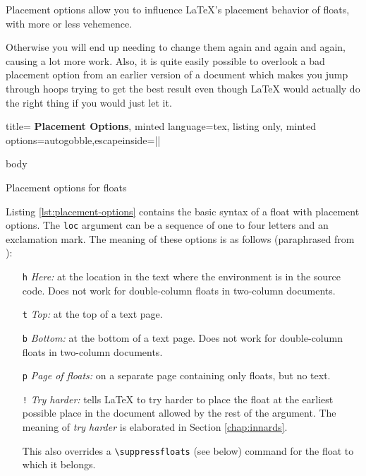 \documentclass[article,a4paper,oneside,10pt]{memoir}
\newcommand\code[1]{\texttt{#1}}
\begin{document}
Placement  options  allow you  to  influence  \LaTeX's placement  behavior  of
floats, with more or less vehemence.

 Otherwise you will end up needing to change them again and
again and again, causing a lot more work. Also, it is quite easily possible to
overlook  a  bad placement  option  from  an  earlier  version of  a  document
which  makes  you jump  through  hoops  trying to  get  the  best result  even
though  \LaTeX{} would  actually do  the  right thing  if you  would just  let
it\footnotemark.


\begin{listing}
    \begin{tcblisting}{%
            title={\bfseries\sffamily%
                Placement Options},
            minted language=tex,
            listing only,
            minted options={autogobble,escapeinside=||}}
            \begin{float type}[|\textcolor{solarized-red}{loc}|] body \end{float type}
    \end{tcblisting}
    \caption{Placement options for floats}
    \label{lst:placement-options}
\end{listing}

Listing \ref{lst:placement-options} contains the basic  syntax of a float with
placement options. The  \code{loc} argument can be  a sequence of one  to four
letters and  an exclamation mark. The meaning  of these options is  as follows
(paraphrased from \cite{lamport}):

\begin{itemize}
    \item  [\code{h}] \emph{Here:}  at  the  location in  the  text where  the
        environment is  in the  source code. Does  not work  for double-column
        floats in two-column documents.

    \item [\code{t}] \emph{Top:} at the top of a text page.

    \item [\code{b}]  \emph{Bottom:} at  the bottom of  a text  page. Does not
        work for double-column floats in two-column documents.

    \item [\code{p}] \emph{Page of floats:} on a separate page containing only
        floats, but no text.

    \item [\code{!}] \emph{Try harder:} tells  \LaTeX{} to try harder to place
        the float  at the earliest possible  place in the document  allowed by
        the  rest  of  the  argument. The  meaning  of  \emph{try  harder}  is
        elaborated in Section \ref{chap:innards}.

        This also  overrides a \verb|\suppressfloats| (see  below) command for
        the float to which it belongs.
\end{itemize}
\end{document}
